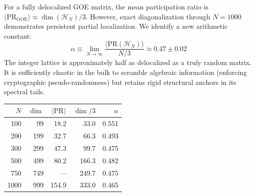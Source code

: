 \documentclass[11pt,a4paper]{article}
\begin{document}
\begin{correspondence}
For a fully delocalized GOE matrix, the mean participation ratio is
$\langle \mathrm{PR}_{\mathrm{GOE}} \rangle \approx \dim(\mathcal{H}_N)/3$.
However, exact diagonalization through $N = 1000$ demonstrates persistent
partial localization. We identify a new arithmetic constant:
\begin{equation}
  \alpha \equiv \lim_{N \to \infty}
  \frac{\langle \mathrm{PR}(\mathcal{H}_N) \rangle}{N/3}
  \approx 0.47 \pm 0.02
  \label{eq:alpha}
\end{equation}
The integer lattice is approximately half as delocalized as a truly random
matrix. It is sufficiently chaotic in the bulk to scramble algebraic
information (enforcing cryptographic pseudo-randomness) but retains rigid
structural anchors in its spectral tails.

\begin{center}
\small
\begin{tabular}{@{}rrrrr@{}}
\toprule
$N$ & $\dim$ & $\langle\mathrm{PR}\rangle$ & $\dim/3$ & $\alpha$ \\
\midrule
100  & 99  & 18.2  & 33.0  & 0.551 \\
200  & 199 & 32.7  & 66.3  & 0.493 \\
300  & 299 & 47.3  & 99.7  & 0.475 \\
500  & 499 & 80.2  & 166.3 & 0.482 \\
750  & 749 & ---   & 249.7 & 0.475 \\
1000 & 999 & 154.9 & 333.0 & 0.465 \\
\bottomrule
\end{tabular}
\end{center}
\end{correspondence}
\end{document}
